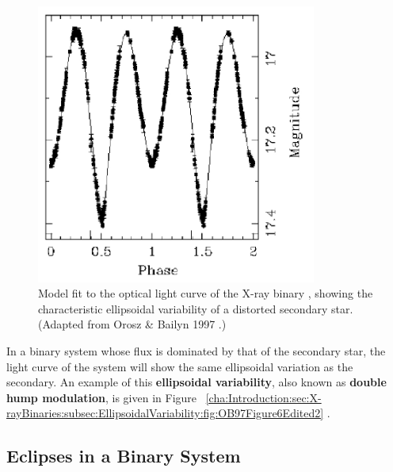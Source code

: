 \begin{figure}[htb]
\begin{center}
\includegraphics[width=9.2cm]{OB97Figure6Edited2}
\caption{%
Model fit to the optical light curve of the X-ray binary \groj,
showing the characteristic ellipsoidal variability of a distorted
secondary star. (Adapted from Orosz \& Bailyn 1997%
.)%
}\label{cha:Introduction:sec:X-rayBinaries:subsec:EllipsoidalVariability:fig:OB97Figure6Edited2}
\end{center}
\end{figure}
\nocite{OroszBailyn:1997} %

\vspace{\myparskip}

In a binary system whose flux is dominated by that of the secondary
star, the light curve of the system will show the same ellipsoidal
variation as the secondary. An example of this \textbf{ellipsoidal
variability}, also known as \textbf{double hump modulation}, is given in Figure~%
\vref{cha:Introduction:sec:X-rayBinaries:subsec:EllipsoidalVariability:fig:OB97Figure6Edited2}%
. %


\subsection{Eclipses in a Binary System}\label{cha:Introduction:sec:X-rayBinaries:subsec:Eclipses}

